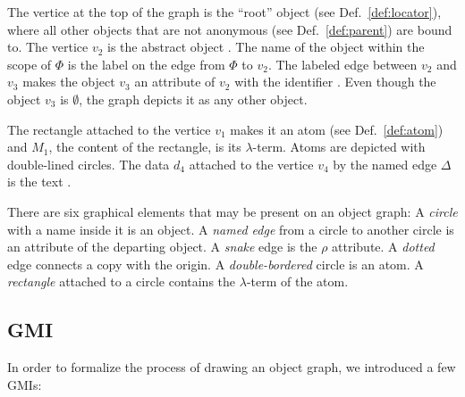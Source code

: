 The vertice at the top of the graph is the ``root'' object (see Def.~\ref{def:locator}),
where all other objects that are not anonymous (see Def.~\ref{def:parent}) are bound to.
The vertice $v_2$ is the abstract object . The name of the object within the
scope of $\Phi$ is the label on the edge from $\Phi$ to $v_2$. The labeled edge
between $v_2$ and $v_3$ makes the object $v_3$ an attribute of $v_2$ with the
identifier . Even though the object $v_3$ is $\emptyset$, the graph
depicts it as any other object.

The rectangle attached to the vertice $v_1$ makes it an atom (see Def.~\ref{def:atom})
and $M_1$, the content of the rectangle, is its $\lambda$-term. Atoms
are depicted with double-lined circles. The data $d_4$
attached to the vertice $v_4$ by the named edge $\Delta$
is the text .

There are six graphical elements that may be present on an object graph:
A \emph{circle} with a name inside it is an object.
A \emph{named edge} from a circle to another circle is an attribute of the departing object.
A \emph{snake} edge is the $\rho$ attribute.
A \emph{dotted} edge connects a copy with the origin.
A \emph{double-bordered} circle is an atom.
A \emph{rectangle} attached to a circle contains the $\lambda$-term of the atom.

\subsection{GMI}

In order to formalize the process of drawing an object graph,
we introduced a few GMIs:

